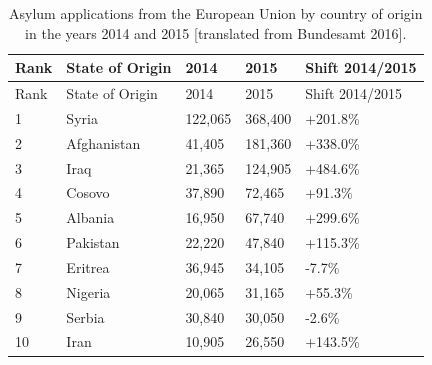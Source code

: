 \documentclass[
  english,
  a4paper,
  DIV=12,
  footlines=2.1,
  usegeometry=true]{scrartcl}
\begin{document}
\begin{longtable}[]{@{}lllll@{}}
\caption{Asylum applications from the European Union by country of
origin in the years 2014 and 2015 {[}translated from Bundesamt 2016{]}.
\label{tbl:asylum}}\tabularnewline
\toprule
Rank & State of Origin & 2014 & 2015 & Shift 2014/2015 \\
\midrule
\endfirsthead
\toprule
Rank & State of Origin & 2014 & 2015 & Shift 2014/2015 \\
\midrule
\endhead
1 & Syria & 122,065 & 368,400 & +201.8\% \\
2 & Afghanistan & 41,405 & 181,360 & +338.0\% \\
3 & Iraq & 21,365 & 124,905 & +484.6\% \\
4 & Cosovo & 37,890 & 72,465 & +91.3\% \\
5 & Albania & 16,950 & 67,740 & +299.6\% \\
6 & Pakistan & 22,220 & 47,840 & +115.3\% \\
7 & Eritrea & 36,945 & 34,105 & -7.7\% \\
8 & Nigeria & 20,065 & 31,165 & +55.3\% \\
9 & Serbia & 30,840 & 30,050 & -2.6\% \\
10 & Iran & 10,905 & 26,550 & +143.5\% \\
\bottomrule
\end{longtable}
\end{document}
